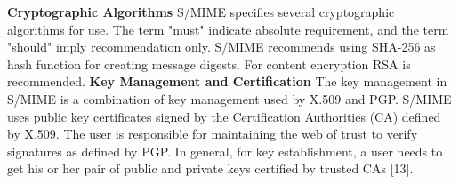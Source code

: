 \textbf{Cryptographic Algorithms}
S/MIME specifies several cryptographic algorithms for use. The term "must" indicate absolute requirement, and the term "should" imply recommendation only. S/MIME recommends using SHA-256 as hash function for creating message digests. For content encryption RSA is recommended.
\newline
\textbf{Key Management and Certification}
The key management in S/MIME is a combination of key management used by X.509 and PGP. S/MIME uses public key certificates signed by the Certification Authorities (CA) defined by X.509. The user is responsible for maintaining the web of trust to verify signatures as defined by PGP. In general, for key establishment, a user needs to get his or her pair of public and private keys certified by trusted CAs [13].

